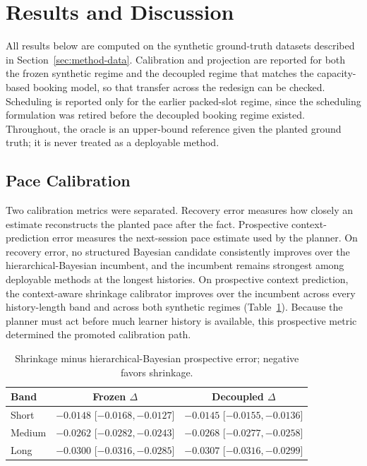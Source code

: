 \documentclass[conference]{IEEEtran}
\begin{document}
\section{Results and Discussion}
All results below are computed on the synthetic ground-truth datasets described in Section~\ref{sec:method-data}. Calibration and projection are reported for both the frozen synthetic regime and the decoupled regime that matches the capacity-based booking model, so that transfer across the redesign can be checked. Scheduling is reported only for the earlier packed-slot regime, since the scheduling formulation was retired before the decoupled booking regime existed. Throughout, the oracle is an upper-bound reference given the planted ground truth; it is never treated as a deployable method.

\subsection{Pace Calibration}
\label{sec:res-cal}
Two calibration metrics were separated. Recovery error measures how closely an estimate reconstructs the planted pace after the fact. Prospective context-prediction error measures the next-session pace estimate used by the planner. On recovery error, no structured Bayesian candidate consistently improves over the hierarchical-Bayesian incumbent, and the incumbent remains strongest among deployable methods at the longest histories. On prospective context prediction, the context-aware shrinkage calibrator improves over the incumbent across every history-length band and across both synthetic regimes (Table~\ref{tab:res-cal}). Because the planner must act before much learner history is available, this prospective metric determined the promoted calibration path.

\begin{table}[!t]
\centering
\caption{Shrinkage minus hierarchical-Bayesian prospective error; negative favors shrinkage.}
\label{tab:res-cal}
\scriptsize
\begin{tabular}{@{}l c c@{}}
\toprule
\textbf{Band} & \textbf{Frozen $\Delta$} & \textbf{Decoupled $\Delta$} \\
\midrule
Short & $-0.0148$ [$-0.0168,-0.0127$] & $-0.0145$ [$-0.0155,-0.0136$] \\
Medium & $-0.0262$ [$-0.0282,-0.0243$] & $-0.0268$ [$-0.0277,-0.0258$] \\
Long & $-0.0300$ [$-0.0316,-0.0285$] & $-0.0307$ [$-0.0316,-0.0299$] \\
\bottomrule
\end{tabular}
\end{table}
\end{document}
